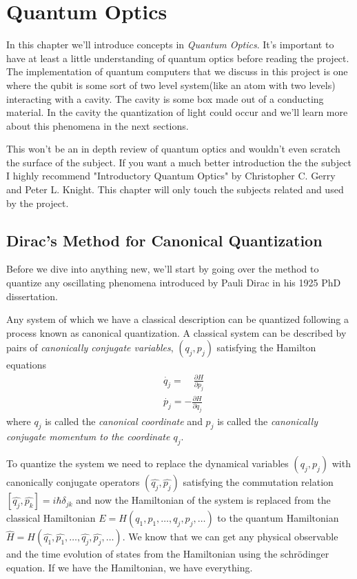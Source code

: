 \documentclass[english, a4paper, 12pt, twoside]{article}
\numberwithin{equation}{section} %
\begin{document}
\newpage
\section{Quantum Optics} \label{chap:quantum-optics}
In this chapter we'll introduce concepts in \textit{Quantum Optics}. It's important to have at least a little understanding of quantum optics before reading the project. The implementation of quantum computers that we discuss in this project is one where the qubit is some sort of two level system(like an atom with two levels) interacting with a cavity. The cavity is some box made out of a conducting material. In the cavity the quantization of light could occur and we'll learn more about this phenomena in the next sections.

This won't be an in depth review of quantum optics and wouldn't even scratch the surface of the subject. If you want a much better introduction the the subject I highly recommend "Introductory Quantum Optics" by Christopher C. Gerry and Peter L. Knight. This chapter will only touch the subjects related and used by the project.

\subsection{Dirac's Method for Canonical Quantization}
Before we dive into anything new, we'll start by going over the method to quantize any oscillating phenomena introduced by Pauli Dirac in his 1925 PhD dissertation.

Any system of which we have a classical description can be quantized following a process known as canonical quantization. A classical system can be described by pairs of \textit{canonically conjugate variables}, $(q_j, p_j)$ satisfying the Hamilton equations
\begin{align*}
    &\dot{q_j} =\quad \frac{\partial H}{\partial p_j} \\
    &\dot{p_j} = -\frac{\partial H}{\partial q_j}
\end{align*}
where $q_j$ is called the \textit{canonical coordinate} and $p_j$ is called the \textit{canonically conjugate momentum to the coordinate $q_j$}.

To quantize the system we need to replace the dynamical variables $(q_j, p_j)$ with canonically conjugate operators $(\hat{q_j}, \hat{p_j})$ satisfying the commutation relation $[\hat{q_j}, \hat{p_k}] = i\hbar \delta_{jk}$ and now the Hamiltonian of the system is replaced from the classical Hamiltonian $E = H(q_1,p_1, \dots ,q_j, p_j, \dots)$ to the quantum Hamiltonian $\hat{H} = H(\hat{q_1},\hat{p_1}, \dots ,\hat{q_j}, \hat{p_j}, \dots)$. We know that we can get any physical observable and the time evolution of states from the Hamiltonian using the schr\"{o}dinger equation. If we have the Hamiltonian, we have everything.
\end{document}
